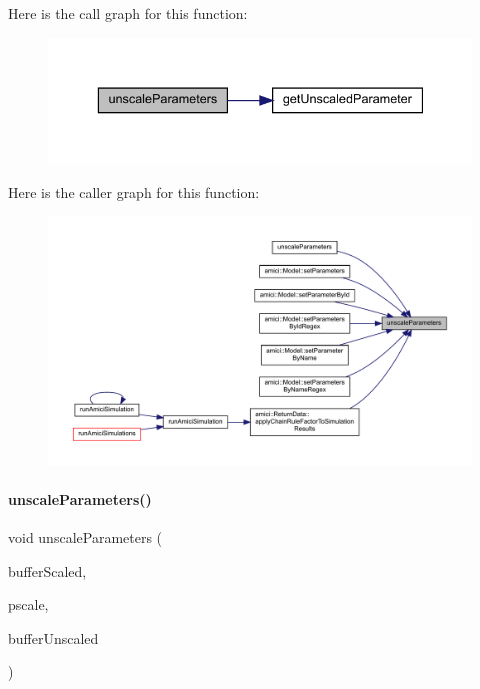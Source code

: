 Here is the call graph for this function\+:
\nopagebreak
\begin{figure}[H]
\begin{center}
\leavevmode
\includegraphics[width=336pt]{namespaceamici_af7d0af67f181a659c78b7aa2bbaaf718_cgraph}
\end{center}
\end{figure}
Here is the caller graph for this function\+:
\nopagebreak
\begin{figure}[H]
\begin{center}
\leavevmode
\includegraphics[width=350pt]{namespaceamici_af7d0af67f181a659c78b7aa2bbaaf718_icgraph}
\end{center}
\end{figure}
\mbox{\label{namespaceamici_a431c1153fbdccf5ab726863030bc2701}} 
\paragraph{\texorpdfstring{unscaleParameters()}{unscaleParameters()}\hspace{0.1cm}{\footnotesize\ttfamily [2/2]}}
{\footnotesize\ttfamily void unscale\+Parameters (\begin{DoxyParamCaption}\item[{std\+::vector$<$ double $>$ const \&}]{buffer\+Scaled,  }\item[{std\+::vector$<$ \mbox{\hyperlink{namespaceamici_a42f062082226e9284c201d9eab71a3a0}{Parameter\+Scaling}} $>$ const \&}]{pscale,  }\item[{std\+::vector$<$ double $>$ \&}]{buffer\+Unscaled }\end{DoxyParamCaption})}

